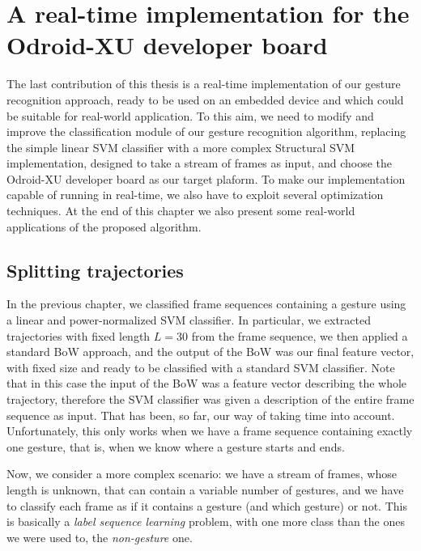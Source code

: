 
\chapter{A real-time implementation for the Odroid-XU developer board}


The last contribution of this thesis is a real-time implementation of our gesture recognition approach, ready to be used on an embedded device and which could be suitable for real-world application. To this aim, we need to modify and improve the classification module of our gesture recognition algorithm, replacing the simple linear SVM classifier with a more complex Structural SVM implementation, designed to take a stream of frames as input, and choose the Odroid-XU developer board as our target plaform. To make our implementation capable of running in real-time, we also have to exploit several optimization techniques. At the end of this chapter we also present some real-world applications of the proposed algorithm.

\section{Splitting trajectories}
In the previous chapter, we classified frame sequences containing a gesture using a linear and power-normalized SVM classifier. In particular, we extracted trajectories with fixed length $L=30$ from the frame sequence, we then applied a standard BoW approach, and the output of the BoW was our final feature vector, with fixed size and ready to be classified with a standard SVM classifier. Note that in this case the input of the BoW was a feature vector describing the whole trajectory, therefore the SVM classifier was given a description of the entire frame sequence as input. That has been, so far, our way of taking time into account. Unfortunately, this only works when we have a frame sequence containing exactly one gesture, that is, when we know where a gesture starts and ends.

Now, we consider a more complex scenario: we have a stream of frames, whose length is unknown, that can contain a variable number of gestures, and we have to classify each frame as if it contains a gesture (and which gesture) or not. This is basically a \textit{label sequence learning} problem, with one more class than the ones we were used to, the \textit{non-gesture} one.

